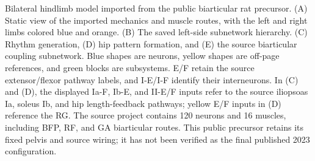 \caption[Public biarticular rat model and native subnetworks]{Bilateral hindlimb model imported from the public biarticular rat precursor. (A) Static view of the imported mechanics and muscle routes, with the left and right limbs colored blue and orange. (B) The saved left-side subnetwork hierarchy. (C) Rhythm generation, (D) hip pattern formation, and (E) the source biarticular coupling subnetwork. Blue shapes are neurons, yellow shapes are off-page references, and green blocks are subsystems. E/F retain the source extensor/flexor pathway labels, and I-E/I-F identify their interneurons. In (C) and (D), the displayed Ia-F, Ib-E, and II-E/F inputs refer to the source iliopsoas Ia, soleus Ib, and hip length-feedback pathways; yellow E/F inputs in (D) reference the RG. The source project contains 120 neurons and 16 muscles, including BFP, RF, and GA biarticular routes. This public precursor retains its fixed pelvis and source wiring; it has not been verified as the final published 2023 configuration.}
